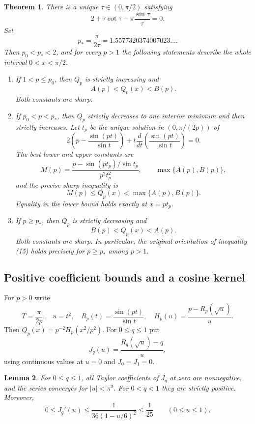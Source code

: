 \documentclass[11pt,a4paper]{article}
\numberwithin{equation}{section}
\newtheorem{theorem}{Theorem}[section]
\newtheorem{lemma}[theorem]{Lemma}
\theoremstyle{remark}
\begin{document}
\begin{theorem}\label{thm:sine-classification}
There is a unique $\tau\in(0,\pi/2)$ satisfying
\begin{equation}\label{eq:tau}
 2+\tau\cot\tau-\pi\frac{\sin\tau}{\tau}=0.
\end{equation}
Set
\[
 p_* =\frac{\pi}{2\tau}
       =1.5577320374007023\ldots .
\]
Then $p_0<p_*<2$, and for every $p>1$ the following statements
describe the whole interval $0<x<\pi/2$.
\begin{enumerate}[label=(\roman*)]
\item If $1<p\le p_0$, then $Q_p$ is strictly increasing and
\[
 A(p)<Q_p(x)<B(p).
\]
Both constants are sharp.
\item If $p_0<p<p_*$, then $Q_p$ strictly decreases to one
interior minimum and then strictly increases. Let $t_p$ be the unique
solution in $(0,\pi/(2p))$ of
\begin{equation}\label{eq:critical-t}
 2\left(p-\frac{\sin(pt)}{\sin t}\right)
 +t\frac{d}{dt}\left(\frac{\sin(pt)}{\sin t}\right)=0.
\end{equation}
The best lower and upper constants are
\[
 M(p)=\frac{p-\sin(pt_p)/\sin t_p}{p^2t_p^2},
 \qquad \max\{A(p),B(p)\},
\]
and the precise sharp inequality is
\[
 M(p)\le Q_p(x)<\max\{A(p),B(p)\}.
\]
Equality in the lower bound holds exactly at $x=pt_p$.
\item If $p\ge p_*$, then $Q_p$ is strictly decreasing and
\[
 B(p)<Q_p(x)<A(p).
\]
Both constants are sharp. In particular, the original orientation
of inequality (15) holds precisely for $p\ge p_*$ among $p>1$.
\end{enumerate}
\end{theorem}

\subsection{Positive coefficient bounds and a cosine kernel}

For $p>0$ write
\[
 T=\frac{\pi}{2p},\quad u=t^2,\quad
 R_p(t)=\frac{\sin(pt)}{\sin t},\quad
 H_p(u)=\frac{p-R_p(\sqrt u)}{u}.
\]
Then $Q_p(x)=p^{-2}H_p(x^2/p^2)$. For $0\le q\le1$ put
\[
 J_q(u)=\frac{R_q(\sqrt u)-q}{u},
\]
using continuous values at $u=0$ and $J_0=J_1=0$.

\begin{lemma}\label{lem:J}
For $0\le q\le1$, all Taylor coefficients of $J_q$ at zero
are nonnegative, and the series converges for $|u|<\pi^2$.
For $0<q<1$ they are strictly positive. Moreover,
\begin{equation}\label{eq:J-deriv}
 0\le J_q'(u)\le\frac{1}{36(1-u/6)^2}\le\frac1{25}
 \qquad(0\le u\le1).
\end{equation}
\end{lemma}
\end{document}

